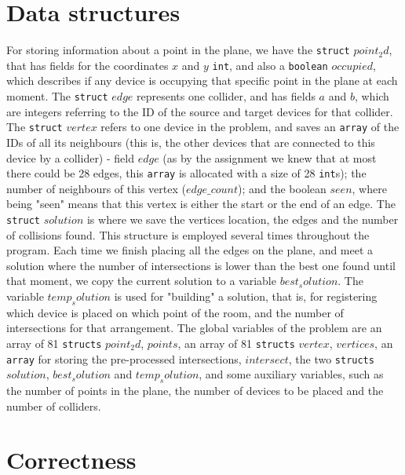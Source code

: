 \documentclass[12pt]{article}
\begin{document}
\section*{Data structures}\label{dataStruct}

\qquad For storing information about a point in the plane, we have the \verb|struct| $point_2d$, that has fields for the coordinates $x$ and $y$ \verb|int|, and also a \verb|boolean| $occupied$, which describes if any device is occupying that specific point in the plane at each moment. 
The \verb|struct| $edge$ represents one collider, and has fields $a$ and $b$, which are integers referring to the ID of the source and target devices for that collider.
The \verb|struct| $vertex$ refers to one device in the problem, and saves an \verb|array| of the IDs of all its neighbours (this is, the other devices that are connected to this device by a collider) - field $edge$ (as by the assignment we knew that at most there could be 28 edges, this \verb|array| is allocated with a size of 28 \verb|int|s); the number of neighbours of this vertex ($edge\_count$); and the boolean $seen$, where being "seen" means that this vertex is either the start or the end of an edge.
The \verb|struct| $solution$ is where we save the vertices location, the edges and the number of collisions found. This structure is employed several times throughout the program. Each time we finish placing all the edges on the plane, and meet a solution where the number of intersections is lower than the best one found until that moment, we copy the current solution to a variable $best_solution$. The variable $temp_solution$ is used for "building" a solution, that is, for registering which device is placed on which point of the room, and the number of intersections for that arrangement. The global variables of the problem are an array of 81 \verb|structs| $point_2d$, $points$, an array of 81 \verb|structs| $vertex$, $vertices$, an \verb|array| for storing the pre-processed intersections, $intersect$, the two \verb|structs| $solution$, $best_solution$ and $temp_solution$, and some auxiliary variables, such as the number of points in the plane, the number of devices to be placed and the number of colliders.

\section*{Correctness}
\end{document}
